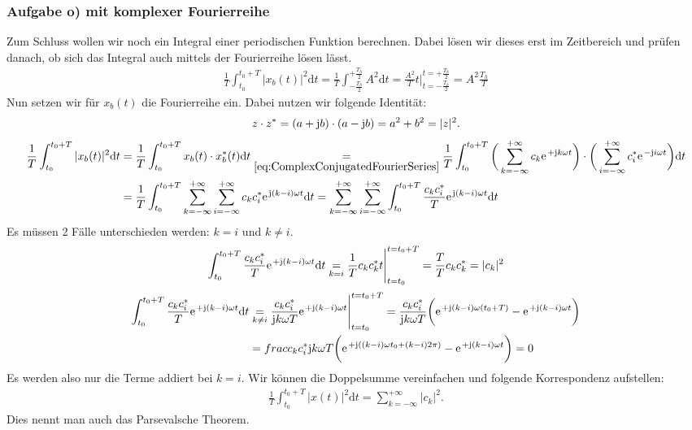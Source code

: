 \documentclass[11pt,a4paper,DIV=12]{scrartcl}
\newcommand{\diff}{\mathrm{d}}
\begin{document}
\subsubsection*{Aufgabe o) mit komplexer Fourierreihe}
Zum Schluss wollen wir noch ein Integral einer periodischen Funktion berechnen. Dabei lösen wir dieses erst im Zeitbereich und prüfen danach, ob sich das Integral auch mittels der Fourierreihe lösen lässt.
\begin{align}
	\frac{1}{T}\int_{t_0}^{t_0+T}|x_b(t)|^2\diff t=\frac{1}{T}\int_{-\frac{T_h}{2}}^{+\frac{T_h}{2}}A^2\diff t = \frac{A^2}{T}t\Bigg |_{t=-\frac{T_h}{2}}^{t=+\frac{T_h}{2}}=A^2\frac{T_h}{T}
\end{align}
Nun setzen wir für $x_b(t)$ die Fourierreihe ein. Dabei nutzen wir folgende Identität:
\begin{align}
	z\cdot z^*=(a+\im b)\cdot (a-\im b)=a^2+b^2=|z|^2.
\end{align}
\begin{align}
	\frac{1}{T}\int_{t_0}^{t_0+T}|x_b(t)|^2\diff t&=\frac{1}{T}\int_{t_0}^{t_0+T}x_b(t)\cdot x_b^*(t)\diff t \underset{\eqref{eq:ComplexConjugatedFourierSeries}}{=}\frac{1}{T}\int_{t_0}^{t_0+T}\bigg (\sum_{k=-\infty}^{+\infty}c_k\e^{+\im k \omega t}\bigg )\cdot \bigg (\sum_{i=-\infty}^{+\infty}c_i^*\e^{-\im i \omega t}\bigg )\diff t\nonumber \\
	&=\frac{1}{T}\int_{t_0}^{t_0+T}\sum_{k=-\infty}^{+\infty}\sum_{i=-\infty}^{+\infty}c_kc_i^*\e^{\im (k-i)\omega t}\diff t =\sum_{k=-\infty}^{+\infty}\sum_{i=-\infty}^{+\infty}\int_{t_0}^{t_0+T}\frac{c_kc_i^*}{T}\e^{\im (k-i)\omega t}\diff t
\end{align}
Es müssen 2 Fälle unterschieden werden: $k=i$ und $k\neq i$.
\begin{align}
	\int_{t_0}^{t_0+T}\frac{c_kc_i^*}{T}\e^{+\im (k-i)\omega t}\diff t \underset{k=i}{=}\frac{1}{T}c_kc_k^*t\Bigg |_{t=t_0}^{t=t_0+T}=\frac{T}{T}c_kc_k^*=|c_k|^2
\end{align}
\begin{align}
	\int_{t_0}^{t_0+T}\frac{c_kc_i^*}{T}\e^{+\im (k-i)\omega t}\diff t &\underset{k\neq i}{=}\frac{c_kc_i^*}{\im k \omega T}\e^{+\im (k-i)\omega t}\Bigg |_{t=t_0}^{t=t_0+T}=\frac{c_kc_i^*}{\im k \omega T}\bigg (\e^{+\im (k-i)\omega (t_0+T)}-\e^{+\im (k-i)\omega t}\bigg )\nonumber \\
	&=frac{c_kc_i^*}{\im k \omega T}\bigg (\e^{+\im ((k-i)\omega t_0+(k-i)2\pi)}-\e^{+\im (k-i)\omega t}\bigg )=0
\end{align}
Es werden also nur die Terme addiert bei $k=i$.
Wir können die Doppelsumme vereinfachen und folgende Korrespondenz aufstellen:
\begin{align}
	\frac{1}{T}\int_{t_0}^{t_0+T}|x(t)|^2\diff t=\sum_{k=-\infty}^{+\infty}|c_k|^2.
\end{align}
Dies nennt man auch das Parsevalsche Theorem.




\renewcommand{\refname}{Buchzitate}
\clearpage

\end{document}
